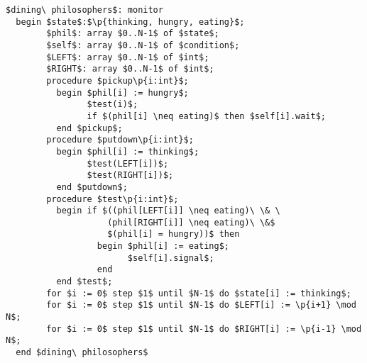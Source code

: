 
\begin{lstlisting}[language=hoare-1974]
$dining\ philosophers$: monitor
  begin $state$:$\p{thinking, hungry, eating}$;
        $phil$: array $0..N-1$ of $state$;
        $self$: array $0..N-1$ of $condition$;
        $LEFT$: array $0..N-1$ of $int$;
        $RIGHT$: array $0..N-1$ of $int$;
        procedure $pickup\p{i:int}$;
          begin $phil[i] := hungry$;
                $test(i)$;
                if $(phil[i] \neq eating)$ then $self[i].wait$;
          end $pickup$;
        procedure $putdown\p{i:int}$;
          begin $phil[i] := thinking$;
                $test(LEFT[i])$;
                $test(RIGHT[i])$;
          end $putdown$;
        procedure $test\p{i:int}$;
          begin if $((phil[LEFT[i]] \neq eating)\ \& \
                    (phil[RIGHT[i]] \neq eating)\ \&$
                    $(phil[i] = hungry))$ then
                  begin $phil[i] := eating$;
                        $self[i].signal$;
                  end
          end $test$;
        for $i := 0$ step $1$ until $N-1$ do $state[i] := thinking$;
        for $i := 0$ step $1$ until $N-1$ do $LEFT[i] := \p{i+1} \mod N$;
        for $i := 0$ step $1$ until $N-1$ do $RIGHT[i] := \p{i-1} \mod N$;
  end $dining\ philosophers$
\end{lstlisting}
